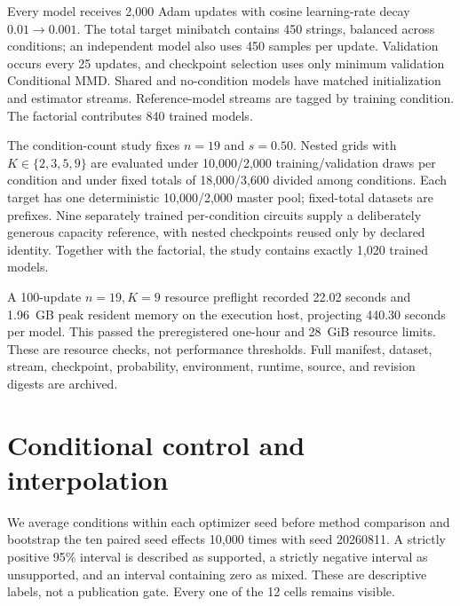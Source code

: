 \documentclass[a4paper,twocolumn,11pt,unpublished]{quantumarticle}
\begin{document}
Every model receives 2,000 Adam updates with cosine learning-rate decay
$0.01\rightarrow0.001$.  The total target minibatch contains 450 strings,
balanced across conditions; an independent model also uses 450 samples per
update.  Validation occurs every 25 updates, and checkpoint selection uses
only minimum validation Conditional MMD.  Shared and no-condition models have
matched initialization and estimator streams.  Reference-model streams are
tagged by training condition.  The factorial contributes 840 trained models.

The condition-count study fixes $n=19$ and $s=0.50$.  Nested grids with
$K\in\{2,3,5,9\}$ are evaluated under 10,000/2,000 training/validation draws
per condition and under fixed totals of 18,000/3,600 divided among
conditions.  Each target has one deterministic 10,000/2,000 master pool;
fixed-total datasets
are prefixes.  Nine separately trained per-condition circuits supply a
deliberately generous capacity reference, with nested checkpoints reused only
by declared identity.  Together with the factorial, the study contains exactly
1,020 trained models.

A 100-update $n=19,K=9$ resource preflight recorded 22.02 seconds and
1.96~GB peak resident memory on the execution host, projecting 440.30 seconds
per model.  This passed the preregistered one-hour and 28~GiB resource limits.
These are resource checks, not performance thresholds.  Full manifest,
dataset, stream, checkpoint, probability, environment, runtime, source, and
revision digests are archived.

\section{Conditional control and interpolation}
\label{sec:headline}

We average conditions within each optimizer seed before method comparison and
bootstrap the ten paired seed effects 10,000 times with seed 20260811.  A
strictly positive 95\% interval is described as supported, a strictly negative
interval as unsupported, and an interval containing zero as mixed.  These are
descriptive labels, not a publication gate.  Every one of the 12 cells remains
visible.
\end{document}
